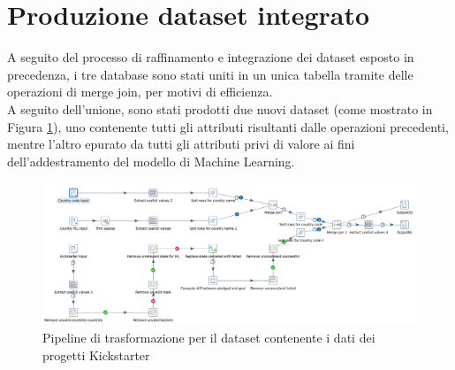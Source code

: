 \section{Produzione dataset integrato}
A seguito del processo di raffinamento e integrazione dei dataset esposto in precedenza, i tre database sono stati uniti in un unica tabella tramite delle operazioni di merge join, per motivi di efficienza.\\
A seguito dell'unione, sono stati prodotti due nuovi dataset (come mostrato in Figura \ref{fig:transformationcomplete}), uno contenente tutti gli attributi risultanti dalle operazioni precedenti, mentre l'altro epurato da tutti gli attributi privi di valore ai fini dell'addestramento del modello di Machine Learning.

\begin{figure}
	\centering
	\includegraphics[angle=90,origin=c,width=0.55\linewidth]{images/transformation_complete}
	\caption{Pipeline di trasformazione per il dataset contenente i dati dei progetti Kickstarter}
	\label{fig:transformationcomplete}
\end{figure}

